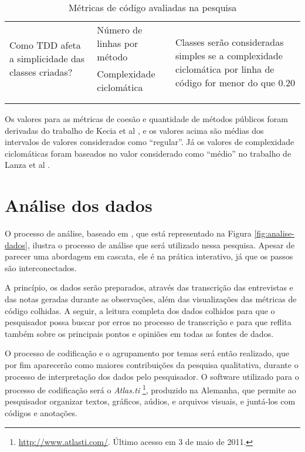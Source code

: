 \begin{table}[h!]
\begin{tabular}{ | p{5cm} | p{5cm} | p{5cm} | }
		\multirow{2}{5cm}{Como TDD afeta a simplicidade das classes criadas?}
		& Número de linhas por método & 
		\multirow{4}{5cm}{Classes serão consideradas simples se a complexidade
		ciclomática por linha de código for menor do que 0.20 } \\
		& Complexidade ciclomática & \\
		& & \\ & & \\
		
		\hline
	\end{tabular}
	\caption{Métricas de código avaliadas na pesquisa}
	\label{tab:metricas}
\end{table}

Os valores para as métricas de coesão e quantidade de métodos públicos foram
derivadas do trabalho de Kecia et al \cite{kecia}, e os valores acima são médias
dos intervalos de valores considerados como ``regular''. Já os valores de
complexidade ciclomáticas foram baseados no valor considerado como ``médio'' no
trabalho de Lanza et al \cite{lanza}.

\section{Análise dos dados}
\label{sec:planejamento-analise}

O processo de análise, baseado em \cite{creswell}, que está representado na
Figura \ref{fig:analise-dados}, ilustra o processo de análise que será utilizado
nessa pesquisa. Apesar de parecer uma abordagem em cascata, ele é na prática 
interativo, já que os passos são interconectados. 

A princípio, os dados serão preparados, através das transcrição das
entrevistas e das notas geradas durante as observações, além das
visualizações das métricas de código colhidas. A seguir, a leitura completa dos
dados colhidos para que o pesquisador possa buscar por erros no processo de
transcrição e para que reflita também sobre os principais pontos e opiniões em
todas as fontes de dados.

O processo de codificação e o agrupamento
por temas será então realizado, que por fim aparecerão como maiores
contribuições da pesquisa qualitativa, durante o processo de interpretação dos
dados pelo pesquisador. O software utilizado para o processo de codificação será
o \textit{Atlas.ti} \footnote{\url{http://www.atlasti.com/}. Último acesso em 3
de maio de 2011.}, produzido na Alemanha, que permite ao pesquisador organizar textos,
gráficos, aúdios, e arquivos visuais, e juntá-los com códigos e anotações. 

